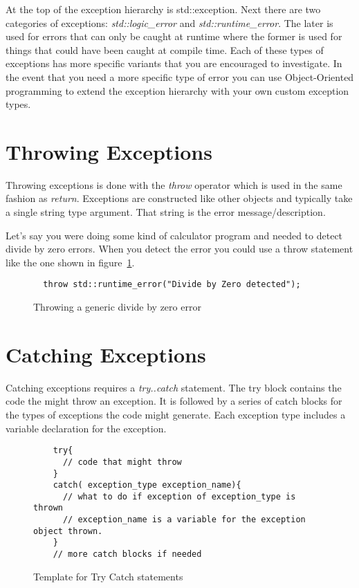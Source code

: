 \documentclass[nobib]{tufte-handout}
\begin{document}
At the top of the exception hierarchy is std::exception. Next there are two categories of exceptions: \textit{std::logic\_error} and \textit{std::runtime\_error}. The later is used for errors that can only be caught at runtime where the former is used for things that could have been caught at compile time. Each of these types of exceptions has more specific variants that you are encouraged to investigate. In the event that you need a more specific type of error you can use Object-Oriented programming to extend the exception hierarchy with your own custom exception types.

\section{Throwing Exceptions}

Throwing exceptions is done with the \textit{throw} operator which is used in the same fashion as \textit{return}. Exceptions are constructed like other objects and typically take a single string type argument. That string is the error message/description.

Let's say you were doing some kind of calculator program and needed to detect divide by zero errors. When you detect the error you could use a throw statement like the one shown in figure~\ref{throwing}.

\begin{figure}[htbp!]
\begin{lstlisting}
  throw std::runtime_error("Divide by Zero detected");
\end{lstlisting}
\caption{Throwing a generic divide by zero error}
\label{throwing}
\end{figure}

\section{Catching Exceptions}

Catching exceptions requires a \textit{try..catch} statement. The try block contains the code the might throw an exception. It is followed by a series of catch blocks for the types of exceptions the code might generate. Each exception type includes a variable declaration for the exception.

\begin{figure}[htbp!]
  \begin{lstlisting}
    try{
      // code that might throw
    }
    catch( exception_type exception_name){
      // what to do if exception of exception_type is thrown
      // exception_name is a variable for the exception object thrown.
    }
    // more catch blocks if needed

  \end{lstlisting}
\label{trycatchtemplate}
\caption{Template for Try Catch statements}
\end{figure}
\end{document}
